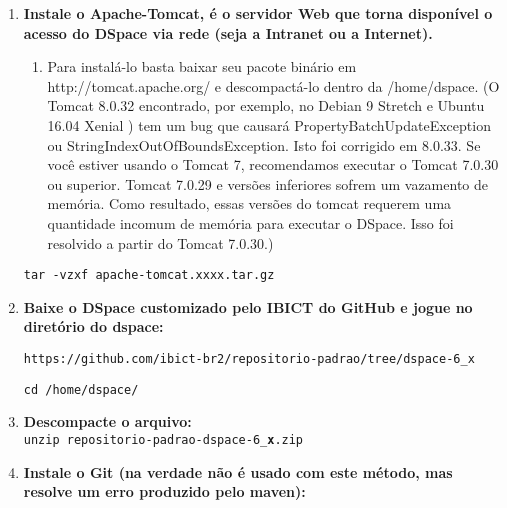 \documentclass[12pt,hidelinks]{article}
\begin{document}
\begin{enumerate}
\begin{enumerate}
        \end{enumerate}
        
        \item \textbf{Instale o Apache-Tomcat, é o servidor Web que torna disponível o acesso do DSpace via rede (seja a Intranet ou a Internet).} \\
    
        
        \begin{enumerate}
            \item Para instalá-lo basta baixar seu pacote binário em http://tomcat.apache.org/ e descompactá-lo dentro da /home/dspace. (O Tomcat 8.0.32 encontrado, por exemplo, no Debian 9 Stretch e Ubuntu 16.04 Xenial ) tem um bug que causará PropertyBatchUpdateException ou StringIndexOutOfBoundsException.   Isto foi corrigido em 8.0.33. Se você estiver usando o Tomcat 7, recomendamos executar o Tomcat 7.0.30 ou superior. Tomcat 7.0.29 e versões inferiores sofrem um vazamento de memória. Como resultado, essas versões do tomcat requerem uma quantidade incomum de memória para executar o DSpace. Isso foi resolvido a partir do Tomcat 7.0.30.)
        \end{enumerate}
        
                \texttt{tar -vzxf apache-tomcat.xxxx.tar.gz} \\
        
        \item \textbf{Baixe o DSpace customizado pelo IBICT do GitHub e jogue no diretório do dspace:}\\
            
             \begin{verbatim}
https://github.com/ibict-br2/repositorio-padrao/tree/dspace-6_x
            \end{verbatim}
        
            \texttt{cd /home/dspace/}\\
        
        \item \textbf{Descompacte o arquivo:}\\
        
            \texttt{unzip repositorio-padrao-dspace-6\_\textbf{x}.zip}\\
            
        \item \textbf{Instale o Git (na verdade não é usado com este método, mas resolve um erro produzido pelo maven):}\\    
            

\end{enumerate}
\end{document}
